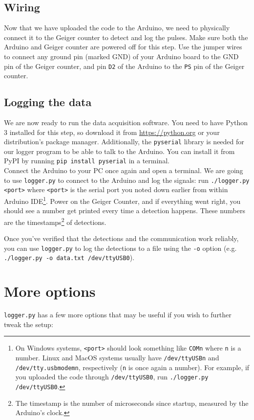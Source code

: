 \documentclass[11pt]{article}
\begin{document}
\subsection{Wiring}
\label{sec:org0986c3d}
Now that we have uploaded the code to the Arduino, we need to physically connect it to the Geiger counter to detect and log the pulses. Make sure both the Arduino and Geiger counter are powered off for this step. Use the jumper wires to connect any ground pin (marked GND) of your Arduino board to the GND pin of the Geiger counter, and pin \texttt{D2} of the Arduino to the \texttt{PS} pin of the Geiger counter.

\subsection{Logging the data}
\label{sec:orgf69259d}
We are now ready to run the data acquisition software. You need to have Python 3 installed for this step, so download it from \url{https://python.org} or your distribution's package manager. Additionally, the \texttt{pyserial} library is needed for our logger program to be able to talk to the Arduino. You can install it from PyPI by running \texttt{pip install pyserial} in a terminal.\\
Connect the Arduino to your PC once again and open a terminal. We are going to use \texttt{logger.py} to connect to the Arduino and log the signals: run \texttt{./logger.py <port>} where \texttt{<port>} is the serial port you noted down earlier from within Arduino IDE\footnote{On Windows systems, \texttt{<port>} should look something like \texttt{COMn} where \texttt{n} is a number. Linux and MacOS systems usually have \texttt{/dev/ttyUSBn} and \texttt{/dev/tty.usbmodemn}, respectively (\texttt{n} is once again a number). For example, if you uploaded the code through \texttt{/dev/ttyUSB0}, run \texttt{./logger.py /dev/ttyUSB0}.}. Power on the Geiger Counter, and if everything went right, you should see a number get printed every time a detection happens. These numbers are the timestamps\footnote{The timestamp is the number of microseconds since startup, measured by the Arduino's clock.} of detections.

Once you've verified that the detections and the communication work reliably, you can use \texttt{logger.py} to log the detections to a file using the \texttt{-o} option (e.g. \texttt{./logger.py -o data.txt /dev/ttyUSB0}).

\section{More options}
\label{sec:orga89c5ed}
\texttt{logger.py} has a few more options that may be useful if you wish to further tweak the setup:
\end{document}
